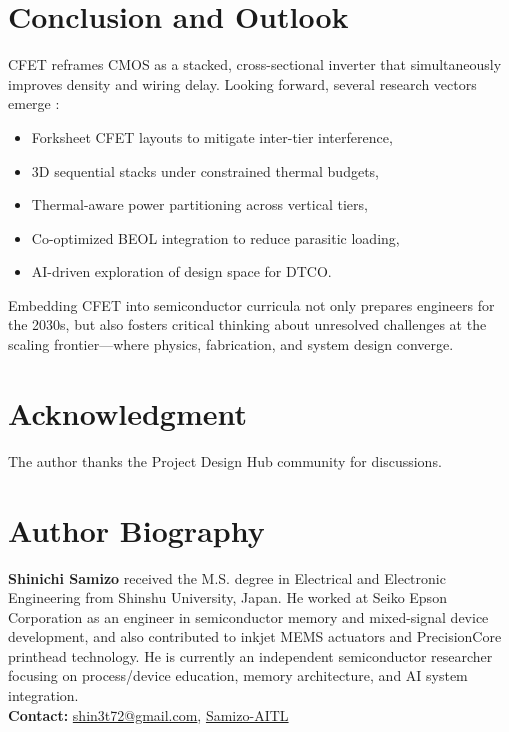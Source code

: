 \documentclass[conference]{IEEEtran}
\begin{document}
\section{Conclusion and Outlook}
CFET reframes CMOS as a stacked, cross-sectional inverter that simultaneously improves density and wiring delay.
Looking forward, several research vectors emerge \cite{colinge_cfet_review2021,irds_2023}:
\begin{itemize}
  \item Forksheet CFET layouts to mitigate inter-tier interference,
  \item 3D sequential stacks under constrained thermal budgets,
  \item Thermal-aware power partitioning across vertical tiers,
  \item Co-optimized BEOL integration to reduce parasitic loading,
  \item AI-driven exploration of design space for DTCO.
\end{itemize}
Embedding CFET into semiconductor curricula not only prepares engineers for the 2030s,
but also fosters critical thinking about unresolved challenges at the scaling frontier---where physics, fabrication, and system design converge.

\section*{Acknowledgment}
The author thanks the Project Design Hub community for discussions.




\section*{Author Biography}
\noindent\textbf{Shinichi Samizo}
received the M.S. degree in Electrical and Electronic Engineering from Shinshu University, Japan.
He worked at Seiko Epson Corporation as an engineer in semiconductor memory and mixed-signal device development, and also contributed to inkjet MEMS actuators and PrecisionCore printhead technology.
He is currently an independent semiconductor researcher focusing on process/device education, memory architecture, and AI system integration.\\[2pt]
\textbf{Contact:} \href{mailto:shin3t72@gmail.com}{shin3t72@gmail.com}, \href{https://github.com/Samizo-AITL}{Samizo-AITL}
\end{document}
